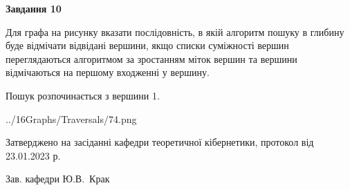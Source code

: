 \documentclass[12pt, ukrainian]{article}
\begin{document}
{\begin {large}
{\begin {center}\textbf{Завдання 10}\end {center}}\par
Для графа на рисунку вказати послідовність, в якій алгоритм пошуку в глибину буде відмічати відвідані вершини, якщо списки суміжності вершин переглядаються алгоритмом за зростанням міток вершин та вершини відмічаються на першому вход\-женні у вершину.\par
Пошук розпочинається з вершини 1.\par

\begin{center}
	{../16Graphs/Traversals/74.png}
\end{center}\par
\newpage


\end {large}
}
{\smallskip \begin {small} Затверджено на засіданні кафедри теоретичної кібернетики, протокол  від   23.01.2023 р.\par\smallskip\smallskip
{\parbox {6.5 cm}{Зав. кафедри \dotfill Ю.В.~Крак}} \end{small}}
\end{document}
